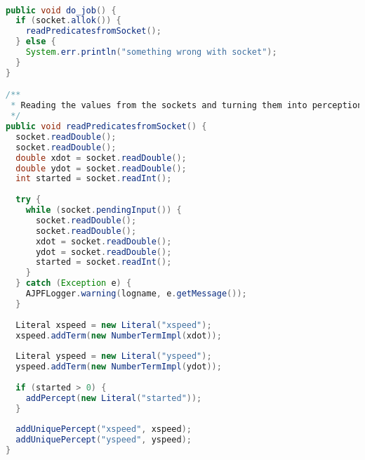 \begin{ourexample}
\label{code:do_job} \quad \\
\begin{lstlisting}[basicstyle=\sffamily,language=Java,style=easslisting]
public void do_job() {
  if (socket.allok()) {
    readPredicatesfromSocket();
  }	else {
    System.err.println("something wrong with socket");
  }
}

/**
 * Reading the values from the sockets and turning them into perceptions.
 */
public void readPredicatesfromSocket() {
  socket.readDouble();
  socket.readDouble();
  double xdot = socket.readDouble();
  double ydot = socket.readDouble();
  int started = socket.readInt();
		
  try {
    while (socket.pendingInput()) {
      socket.readDouble();
      socket.readDouble();
      xdot = socket.readDouble();
      ydot = socket.readDouble();
      started = socket.readInt();			
    }
  } catch (Exception e) {
    AJPFLogger.warning(logname, e.getMessage());
  } 
		
  Literal xspeed = new Literal("xspeed");
  xspeed.addTerm(new NumberTermImpl(xdot));
		
  Literal yspeed = new Literal("yspeed");
  yspeed.addTerm(new NumberTermImpl(ydot));
		
  if (started > 0) {
    addPercept(new Literal("started"));
  }
		
  addUniquePercept("xspeed", xspeed);
  addUniquePercept("yspeed", yspeed);
}
\end{lstlisting}
\end{ourexample}
